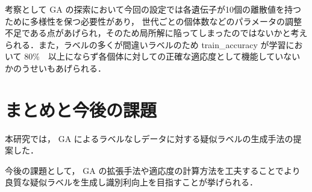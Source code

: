 \documentclass[a4paper,twoside,twocolumn,10pt]{jarticle}     %
\begin{document}
考察として GA の探索において今回の設定では各遺伝子が10個の離散値を持つために多様性を保つ必要性があり，
世代ごとの個体数などのパラメータの調整不足である点があげられ，そのため局所解に陥ってしまったのではないかと考えられる．また，ラベルの多くが間違いラベルのため train\_accuracy が学習において 80\%　以上にならず各個体に対しての正確な適応度として機能していないかのうせいもあげられる．
\
\begin{table}[h]
	\centering
	\caption{実験結果\label{tb:ex1}}
\end{table}

\section{まとめと今後の課題}
本研究では， GA によるラベルなしデータに対する疑似ラベルの生成手法の提案した．

今後の課題として， GA の拡張手法や適応度の計算方法を工夫することでより
良質な疑似ラベルを生成し識別利向上を目指すことが挙げられる．



\end{document}
